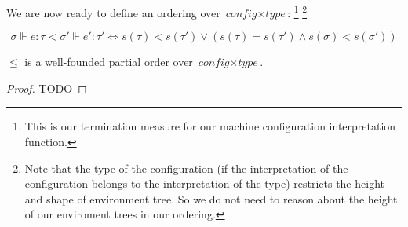 \begin{definition}[Orderings]
  We are now ready to define an ordering over $\textit{config} \times
  \textit{type}$:
  \footnote{This is our termination measure for our machine configuration
  interpretation function.}
  \footnote{Note that the type of the configuration (if the interpretation of
  the configuration belongs to the interpretation of the type) restricts the
  height and shape of environment tree. So we do not need to reason about the
  height of our enviroment trees in our ordering.}

  \begin{equation}
    \sigma \Vdash e : \tau < \sigma' \Vdash e' : \tau' \iff
    s(\tau) < s(\tau') \lor (s(\tau) = s(\tau') \land s(\sigma) < s(\sigma'))
  \end{equation}

\end{definition}

\begin{lemma}
  $\leq$ is a well-founded partial order over $\textit{config} \times
  \textit{type}$.
\end{lemma}
\begin{proof}
  TODO
\end{proof}


